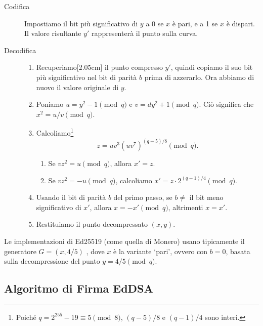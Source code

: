 \begin{description}
	\item[Codifica] Impostiamo il bit più significativo di \(y\) a 0 se \(x\) è pari, e a 1 se \(x\) è dispari. Il valore risultante \(y'\) rappresenterà il punto sulla curva.
	
	\item[Decodifica] \hfill
	    \begin{enumerate}
    	    \item Recuperiamo[2.05cm] il punto compresso \(y'\), quindi copiamo il suo bit più significativo nel bit di parità \(b\) prima di azzerarlo. Ora abbiamo di nuovo il valore originale di \(y\).
    	    \item Poniamo \(u = y^2 - 1 \pmod q\) e \(v = d y^2 + 1 \pmod q\). Ciò significa che \(x^2 = u / v \pmod q\).
    	    \item Calcoliamo\footnote{Poiché \(q = 2^{255} - 19 \equiv 5 \pmod{8}\), \((q-5)/8\) e \((q-1)/4\) sono interi.} \[z = u v^3 (u v^7)^{(q-5)/8} \pmod q.\]
            \begin{enumerate}
                \item Se \(v z^2 = u \pmod q\), allora \(x' = z\).
                \item Se \(v z^2 = -u \pmod q\), calcoliamo \(x' = z \cdot 2^{(q-1)/4} \pmod q\).
            \end{enumerate}
            \item Usando il bit di parità \(b\) del primo passo, se \(b \ne\) il bit meno significativo di \(x'\), allora \(x = -x' \pmod q\), altrimenti \(x = x'\).
            \item Restituiamo il punto decompressato \((x, y)\).
	    \end{enumerate}
\end{description}

Le implementazioni di Ed25519 (come quella di Monero) usano tipicamente il generatore \(G = (x, 4/5)\) \cite{Bernstein2012}, dove \(x\) è la variante ‘pari’, ovvero con \(b = 0\), basata sulla decompressione del punto \(y = 4/5 \pmod q\).


\subsection{Algoritmo di Firma EdDSA}
\label{EdDSA_section}

